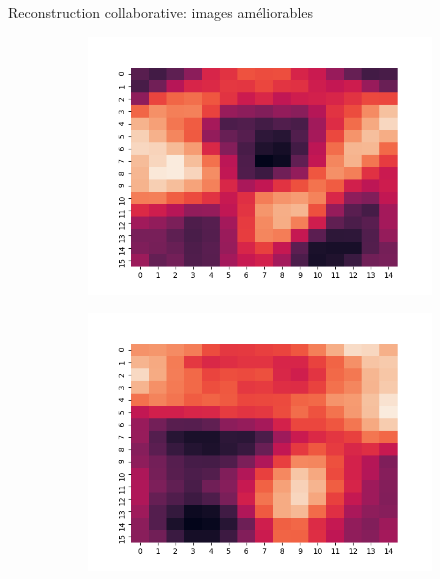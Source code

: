 \documentclass[hyperref={pdfpagelabels=false}]{beamer}
\begin{document}
\begin{frame}{Reconstruction collaborative: images améliorables}
\begin{figure}[h]
\begin{subfigure}[c]{0.18\textwidth}
                \includegraphics[scale=.12]{22}
            \end{subfigure}
            \begin{subfigure}[c]{0.18\textwidth}
                \includegraphics[scale=.12]{33}
            \end{subfigure}
            \begin{subfigure}[c]{0.18\textwidth}

\end{subfigure}
\end{figure}
\end{frame}
\end{document}
